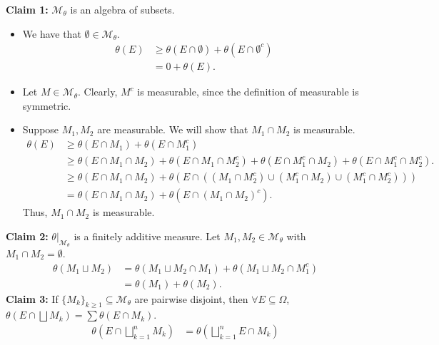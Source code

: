 \documentclass[10pt]{extarticle}
\begin{document}
\begin{description}
        \textbf{Claim 1:} $\mathcal{M}_{\theta}$ is an algebra of subsets.
          \begin{itemize}
            \item We have that $\emptyset\in \mathcal{M}_{\theta}$.
              \begin{align*}
                \theta(E) &\geq \theta(E\cap \emptyset) + \theta(E\cap \emptyset^{c})\\
                          &= 0 + \theta(E).
              \end{align*}
            \item Let $M\in \mathcal{M}_{\theta}$. Clearly, $M^{c}$ is measurable, since the definition of measurable is symmetric.
            \item Suppose $M_1,M_2$ are measurable. We will show that $M_1\cap M_2$ is measurable.
              \begin{align*}
                \theta(E) &\geq \theta(E\cap M_1) + \theta(E \cap M_{1}^{c})\\
                          &\geq \theta(E\cap M_1\cap M_2) + \theta(E\cap M_1 \cap M_{2}^{c}) + \theta(E\cap M_1^{c}\cap M_2) + \theta(E\cap M_{1}^{c} \cap M_{2}^{c}).\\
                          &\geq \theta(E\cap M_1 \cap M_2) + \theta\left(E \cap(\left(M_1\cap M_2^{c}\right) \cup \left(M_1^{c}\cap M_{2}\right) \cup \left(M_1^{c} \cap M_{2}^{c}\right) )\right)\\
                          &= \theta(E \cap M_1\cap M_2) + \theta(E\cap \left(M_1\cap M_2\right)^{c}).
              \end{align*}
              Thus, $M_1\cap M_2$ is measurable.
          \end{itemize}
          \textbf{Claim 2:} $\theta|_{\mathcal{M}_{\theta}}$ is a finitely additive measure. Let $M_1,M_2\in \mathcal{M}_{\theta}$ with $M_1\cap M_2 = \emptyset$.
          \begin{align*}
            \theta(M_1\sqcup M_2) &= \theta(M_1\sqcup M_2 \cap M_1) + \theta(M_1\sqcup M_2 \cap M_1^{c})\\
                                  &= \theta(M_1) + \theta(M_2).
          \end{align*}
          \textbf{Claim 3:} If $\{M_k\}_{k\geq 1}\subseteq \mathcal{M}_{\theta}$ are pairwise disjoint, then $\forall E\subseteq \Omega$, $\theta\left(E\cap \bigsqcup M_k\right) = \sum \theta(E\cap M_k)$.
          \begin{align*}
            \theta\left(E\cap \bigsqcup_{k=1}^{n}M_k\right) &= \theta\left(\bigsqcup_{k=1}^{n}E\cap M_k\right)

\end{align*}
\end{description}
\end{document}
